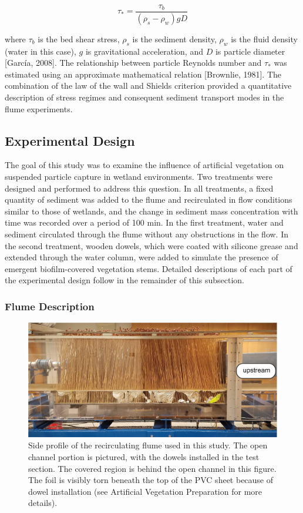 \documentclass[12pt]{article}
\begin{document}
\begin{equation} \label{shields}
    \tau_*=\frac{\tau_b}{(\rho_s-\rho_w)gD}
\end{equation}

\noindent where $\tau_b$ is the bed shear stress, $\rho_s$ is the sediment density, $\rho_w$ is the fluid density (water in this case), $g$ is gravitational acceleration, and $D$ is particle diameter [García, 2008]. The relationship between particle Reynolds number and $\tau_*$ was estimated using an approximate mathematical relation [Brownlie, 1981]. The combination of the law of the wall and Shields criterion provided a quantitative description of stress regimes and consequent sediment transport modes in the flume experiments.

\subsection{Experimental Design}

The goal of this study was to examine the influence of artificial vegetation on suspended particle capture in wetland environments. Two treatments were designed and performed to address this question. In all treatments, a fixed quantity of sediment was added to the flume and recirculated in flow conditions similar to those of wetlands, and the change in sediment mass concentration with time was recorded over a period of 100 min. In the first treatment, water and sediment circulated through the flume without any obstructions in the flow. In the second treatment, wooden dowels, which were coated with silicone grease and extended through the water column, were added to simulate the presence of emergent biofilm-covered vegetation stems. Detailed descriptions of each part of the experimental design follow in the remainder of this subsection.

\subsubsection{Flume Description}

\begin{figure}[H]
    \centering
    \includegraphics[width=6.5in]{flume_photos.png}
    \caption{Side profile of the recirculating flume used in this study. The open channel portion is pictured, with the dowels installed in the test section. The covered region is behind the open channel in this figure. The foil is visibly torn beneath the top of the PVC sheet because of dowel installation (see Artificial Vegetation Preparation for more details).}
    \label{fig_flumephoto}
\end{figure}
\end{document}
